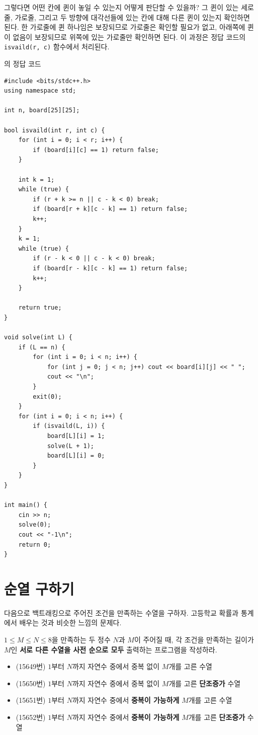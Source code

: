 그렇다면 어떤 칸에 퀸이 놓일 수 있는지 어떻게 판단할 수 있을까? 그 퀸이 있는 세로줄, 가로줄, 그리고 두 방향에 대각선들에 있는 칸에 대해 다른 퀸이 있는지 확인하면 된다. 한 가로줄에 퀸 하나임은 보장되므로 가로줄은 확인할 필요가 없고, 아래쪽에 퀸이 없음이 보장되므로 위쪽에 있는 가로줄만 확인하면 된다. 이 과정은 정답 코드의 \texttt{isvaild(r, c)} 함수에서 처리된다.

\begin{code} \label{code: n-queen}
의 정답 코드
\begin{lstlisting}
#include <bits/stdc++.h>
using namespace std;

int n, board[25][25];

bool isvaild(int r, int c) {
    for (int i = 0; i < r; i++) {
        if (board[i][c] == 1) return false;
    }

    int k = 1;
    while (true) {
        if (r + k >= n || c - k < 0) break;
        if (board[r + k][c - k] == 1) return false;
        k++;
    }
    k = 1;
    while (true) {
        if (r - k < 0 || c - k < 0) break;
        if (board[r - k][c - k] == 1) return false;
        k++;
    }

    return true;
}

void solve(int L) {
    if (L == n) {
        for (int i = 0; i < n; i++) {
            for (int j = 0; j < n; j++) cout << board[i][j] << " ";
            cout << "\n";
        }
        exit(0);
    }
    for (int i = 0; i < n; i++) {
        if (isvaild(L, i)) {
            board[L][i] = 1;
            solve(L + 1);
            board[L][i] = 0;
        }
    }
}

int main() {
    cin >> n;
    solve(0);
    cout << "-1\n";
    return 0;
}
\end{lstlisting}

\end{code}

\section{순열 구하기}

다음으로 백트래킹으로 주어진 조건을 만족하는 수열을 구하자. 고등학교 확률과 통계에서 배우는 것과 비슷한 느낌의 문제다.

\begin{example} $1 \leq M \leq N \leq 8$을 만족하는 두 정수 $N$과 $M$이 주어질 때, 각 조건을 만족하는 길이가 $M$인 \textbf{서로 다른 수열을 사전 순으로 모두} 출력하는 프로그램을 작성하라.
    \begin{itemize}
        \item (15649번) $1$부터 $N$까지 자연수 중에서 중복 없이 $M$개를 고른 수열
        \item (15650번) $1$부터 $N$까지 자연수 중에서 중복 없이 $M$개를 고른 \textbf{단조증가} 수열
        \item (15651번) $1$부터 $N$까지 자연수 중에서 \textbf{중복이 가능하게} $M$개를 고른 수열
        \item (15652번) $1$부터 $N$까지 자연수 중에서 \textbf{중복이 가능하게} $M$개를 고른 \textbf{단조증가} 수열
    \end{itemize}
\end{example}

